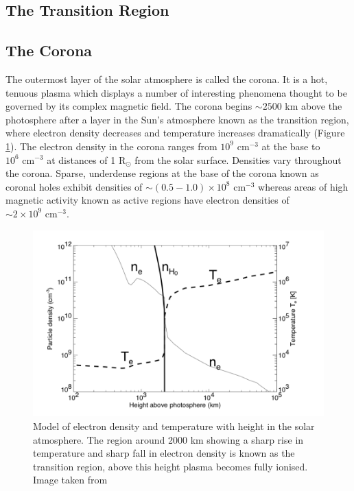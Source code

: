 \subsection{The Transition Region}
\subsection{The Corona}
The outermost layer of the solar atmosphere is called the corona. It is a hot, tenuous plasma which displays a number of interesting phenomena thought to be governed by its complex magnetic field. The corona begins $\sim 2500$ km above the photosphere after a layer in the Sun's atmosphere known as the transition region, where electron density decreases and temperature increases dramatically (Figure \ref{fig:corona_temp}). The electron density in the corona ranges from $10^{9} \mbox{ cm}^{-3}$ at the base to $10^{6} \mbox{ cm}^{-3}$ at distances of 1 R$_{\odot}$ from the solar surface. Densities vary throughout the corona. Sparse, underdense regions at the base of the corona known as coronal holes exhibit densities of $\sim ( 0.5 - 1.0) \times 10^8 \mbox{ cm}^{-3}$ whereas areas of high magnetic activity known as active regions have electron densities of $\sim 2 \times 10^9 \mbox{ cm}^{-3}$.%
\begin{figure}
    \centering
    \includegraphics[width=0.75\columnwidth]{Images/Corona_temp.png}
    \caption[Model of electron density and temperature with height in the solar atmosphere.]{Model of electron density and temperature with height in the solar atmosphere. The region around 2000 km showing a sharp rise in temperature and sharp fall in electron density is known as the transition region, above this height plasma becomes fully ionised. Image taken from \cite{Aschwanden2004}}
    \label{fig:corona_temp}
\end{figure}%

